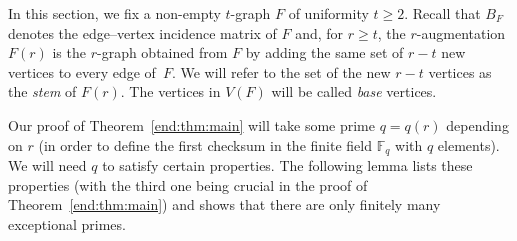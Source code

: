 \documentclass[10pt,a4paper]{article}
\numberwithin{equation}{section}
\newtheorem{lemma}[theorem]{Lemma}
\theoremstyle{definition}
\newtheorem{definition}[theorem]{Definition}
\theoremstyle{remark}
\newcommand{\hide}[1]{{\color{DarkGreen}#1}}
\renewcommand{\hide}[1]{}
\newcommand{\V}[1]{\boldsymbol{#1}}
\begin{document}




In this section, we fix a non-empty $t$-graph $F$ of uniformity $t\ge 2$. Recall that $B_F$ denotes the edge--vertex incidence matrix of $F$ and, for $r\ge t$, the $r$-augmentation $F(r)$ is the $r$-graph obtained from $F$ by adding the same set of $r-t$ new vertices to every edge of~$F$. We will refer to the set of the new $r-t$ vertices as the \emph{stem} of $F(r)$. The vertices in $V(F)$ will be called \emph{base} vertices.

\hide{
It will be convenient to operate with the following property, which we show in Lemma~\ref{lem:app-rank-rigidity} to be equivalent to $B_F$ having zero kernel.

\begin{definition}\label{def:app-sum-rigid}
Call the  $t$-graph $F$  \emph{sum-rigid} if, whenever real numbers $d$ and $(x_v)_{v\in V(F)}$ satisfy
\[
 \sum_{v\in e}x_v=d
 \quad\text{for every }e\in E(F),
\]
then all the numbers $x_v$ for $v\in V(F)$ are equal.
\end{definition}

\begin{lemma}\label{lem:app-rank-rigidity}
The $t$-graph $F$ is sum-rigid if and only if the matrix $B_F$ has zero kernel over $\mathbb R$.
\end{lemma}

\begin{proof} Suppose first that $B_F$ has zero kernel and that all edge sums of a vector $\V{x}\in \mathbb R^{V(F)}$ are equal to $d$.  Since every edge of $F$ has $t$ vertices, it holds that
$B_F\mathbf 1=t\mathbf 1$.
Hence
\[
 B_F\left(\V{x}-\frac dt\mathbf 1\right)=\V{0}.
\]
The kernel of $B_F$ is trivial by our assumption, so $\V{x}=(d/t)\mathbf 1$ and $F$ is sum-rigid.

Conversely, suppose that $F$ is sum-rigid and $B_F\V{x}=0$ for some vector $\V{x}\in \mathbb R^{V(F)}$.  All edge sums of $\V{x}$ are equal to zero, so $\V{x}=c\mathbf 1$ for some $c\in\mathbb R$ by the rigidity assumption.  Then
\[
 0=B_F\V{x}=B_F (c\mathbf 1)=cB_F\mathbf 1=ct\mathbf 1,
\]
which gives $c=0$.  Thus the kernel of $B_F$ is trivial, as desired.
\end{proof}
}



Our proof of Theorem~\ref{end:thm:main} will take some prime $q=q(r)$ depending on $r$ (in order to define the first checksum in the finite field $\mathbb F_q$ with $q$ elements). We will need $q$ to satisfy certain properties.  The following lemma lists these properties (with the third one being crucial in the proof of Theorem~\ref{end:thm:main}) and shows that there are only finitely many exceptional primes.
\end{document}
